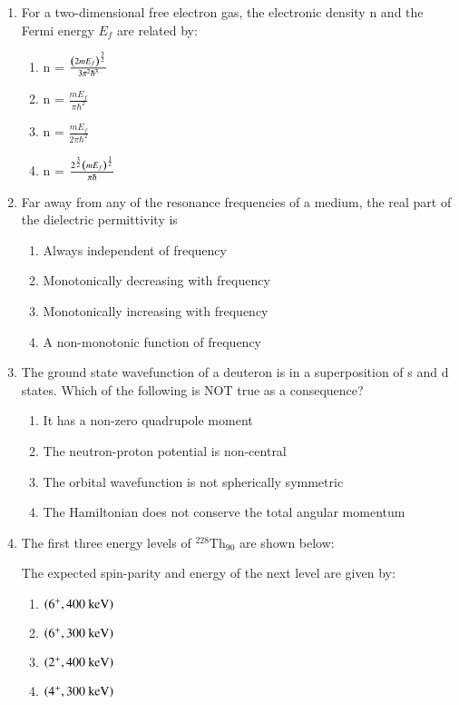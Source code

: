 \documentclass[journal]{IEEEtran}
\begin{document}
\begin{enumerate}[start=27]
\item For a two-dimensional free electron gas, the electronic density n and the Fermi energy $E_f$ are related by:
\begin{multicols}{2}
\begin{enumerate}
\item n = $\frac{\left(2mE_f\right)^{\frac{3}{2}}}{3\pi^2\hbar^3}$\\

\item n = $\frac{mE_f}{\pi\hbar^2}$

\item n = $\frac{mE_f}{2\pi\hbar^2}$\\

\item n = $\frac{2^{\frac{3}{2}}\left(mE_f\right)^{\frac{1}{2}}}{\pi\hbar}$

\end{enumerate}
\end{multicols}

\item Far away from any of the resonance frequencies of a medium, the real part of the dielectric permittivity is
\begin{enumerate}
\item Always independent of frequency
\item Monotonically decreasing with frequency
\item Monotonically increasing with frequency
\item A non-monotonic function of frequency
\end{enumerate}

\item The ground state wavefunction of a deuteron is in a superposition of s and d states. Which of the following is NOT true as a consequence?
\begin{enumerate}
\item It has a non-zero quadrupole moment
\item The neutron-proton potential is non-central
\item The orbital wavefunction is not spherically symmetric
\item The Hamiltonian does not conserve the total angular momentum
\end{enumerate}

\item The first three energy levels of $^{228}\text{Th}_{90}$ are shown below:


The expected spin-parity and energy of the next level are given by:
\begin{multicols}{2}
\begin{enumerate}
\item $\left(6^+, 400 \text{ keV}\right)$
\item $\left(6^+, 300 \text{ keV}\right)$
\item $\left(2^+, 400 \text{ keV}\right)$
\item $\left(4^+, 300 \text{ keV}\right)$
\end{enumerate} 
\end{multicols}


\end{enumerate}
\end{document}
